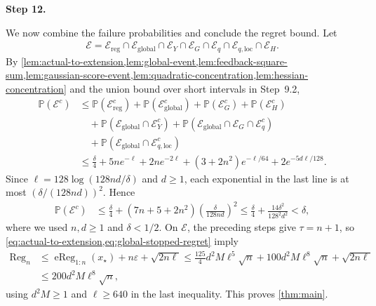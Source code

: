 \documentclass[12pt,cleveref]{jmlr}
\newcommand{\proofstepinline}[1]{%
    \par\addvspace{0.6\baselineskip}
    \noindent
    {\normalfont\normalsize\bfseries\color{blue!55!black}Step #1.}\enspace\ignorespaces
}
\newcommand{\Pp}{\mathbb P}
\newcommand{\1}{\mathbf 1}
\newcommand{\eps}{\varepsilon}
\begin{document}
\proofstepinline{12}
We now combine the failure probabilities and conclude the regret bound.
Let
\begin{align}
    \mathcal E
    =\mathcal E_{\mathrm{reg}}\cap\mathcal E_{\mathrm{global}}
    \cap\mathcal E_Y\cap\mathcal E_G\cap\mathcal E_q
    \cap\mathcal E_{q,\mathrm{loc}}\cap\mathcal E_H.
\end{align}
By \cref{lem:actual-to-extension,lem:global-event,lem:feedback-square-sum,lem:gaussian-score-event,lem:quadratic-concentration,lem:hessian-concentration}
and the union bound over short intervals in Step~9.2,
\begin{align}
    \Pp(\mathcal E^c)
    & \leq\Pp(\mathcal E_{\mathrm{reg}}^c)
    +\Pp(\mathcal E_{\mathrm{global}}^c)
    +\Pp(\mathcal E_G^c)+\Pp(\mathcal E_H^c)
    \\
    & \quad+\Pp(\mathcal E_{\mathrm{global}}\cap\mathcal E_Y^c)
    +\Pp(\mathcal E_{\mathrm{global}}\cap\mathcal E_G\cap\mathcal E_q^c)
    \\
    & \quad+\Pp(\mathcal E_{\mathrm{global}}\cap\mathcal E_{q,\mathrm{loc}}^c)
    \\
    & \leq\frac\delta4+5ne^{-\ell}+2ne^{-2\ell}
    +(3+2n^2)e^{-\ell/64}+2e^{-5d\ell/128}.
\end{align}
Since $\ell=128\log(128nd/\delta)$ and $d\geq1$, each exponential
in the last line is at most $(\delta/(128nd))^2$. Hence
\begin{align}
    \Pp(\mathcal E^c)
    & \leq\frac\delta4
    +(7n+5+2n^2)\left(\frac{\delta}{128nd}\right)^2
    \leq\frac\delta4+\frac{14\delta^2}{128^2d^2}
    <\delta,
\end{align}
where we used $n,d\geq1$ and $\delta<1/2$.
On $\mathcal E$, the preceding steps give $\tau=n+1$, so
\cref{eq:actual-to-extension,eq:global-stopped-regret} imply
\begin{align}
    \operatorname{Reg}_n
    & \leq\operatorname{eReg}_{1:n}(x_\star)
    +n\eps+\sqrt{2n\ell}
    \leq\frac{125}{4}d^2M\ell^5\sqrt n
    +100d^2M\ell^8\sqrt n+\sqrt{2n\ell}       \\
    & \leq200d^2M\ell^8\sqrt n,
\end{align}
using $d^2M\geq1$ and $\ell\geq640$ in the last inequality.
This proves \cref{thm:main}.
\end{document}
